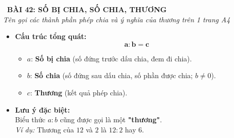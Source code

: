 \documentclass[11pt,a4paper]{article}
\begin{document}
\begin{tcolorbox}[
  enhanced,
  colback=violet!8!white,
  colframe=violet!70!black,
  arc=3mm, boxrule=1.2pt,
  left=3mm, right=3mm, top=2mm, bottom=2mm,
  halign=center
]
  {\LARGE\bfseries\color{violet!90!black}\faBookmark\ BÀI 42: SỐ BỊ CHIA, SỐ CHIA, THƯƠNG}\\[1mm]
  {\itshape\footnotesize\color{black!75} Tên gọi các thành phần phép chia và ý nghĩa của thương trên 1 trang A4}
\end{tcolorbox}

\vspace{-2mm}

\noindent
\begin{minipage}[t]{0.49\textwidth}\vspace{0pt}
\begin{tcolorbox}[
  enhanced,
  colback=violet!4!white,
  colframe=violet!75!black,
  arc=2mm, boxrule=0.8pt,
  left=2mm, right=2mm, top=1.8mm, bottom=1.8mm,
  title={\footnotesize\bfseries\color{white}\faKey\ 1. Thành phần phép chia}
]
{\footnotesize
\begin{itemize}\setlength{\itemsep}{1pt}\setlength{\leftskip}{-2.5mm}
  \item \textbf{Cấu trúc tổng quát:}
  $$\mathbf{a : b = c}$$
  \begin{itemize}\setlength{\itemsep}{0.5pt}\setlength{\leftskip}{-2.5mm}
    \item $a$: \textbf{Số bị chia} (số đứng trước dấu chia, đem đi chia).
    \item $b$: \textbf{Số chia} (số đứng sau dấu chia, số phần được chia; $b \neq 0$).
    \item $c$: \textbf{Thương} (kết quả phép chia).
  \end{itemize}
  \item \textbf{Lưu ý đặc biệt:}\\
  Biểu thức $a : b$ cũng được gọi là một \textbf{"thương"}.\\
  \textit{Ví dụ:} Thương của $12$ và $2$ là $12 : 2$ hay $6$.
\end{itemize}
}
\end{tcolorbox}
\end{minipage}
\hfill
\end{document}
